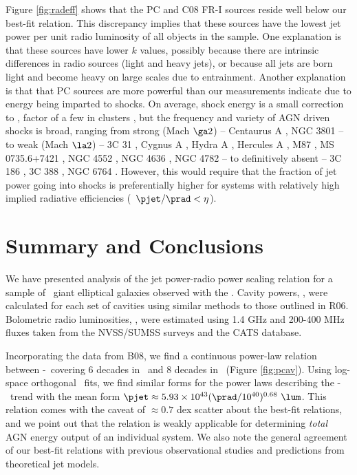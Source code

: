 \documentclass{emulateapj}
\begin{document}
Figure \ref{fig:radeff} shows that the PC and C08 FR-I sources reside
well below our best-fit relation. This discrepancy implies that these
sources have the lowest jet power per unit radio luminosity of all
objects in the sample. One explanation is that these sources have
lower $k$ values, possibly because there are intrinsic differences in
radio sources (light and heavy jets), or because all jets are born
light and become heavy on large scales due to entrainment. Another
explanation is that that PC sources are more powerful than our
measurements indicate due to energy being imparted to shocks. On
average, shock energy is a small correction to \pcav, factor of a few
in clusters \citep{mcnamrev}, but the frequency and variety of AGN
driven shocks is broad, ranging from strong (Mach $\ga 2$) --
Centaurus A \citep{2003ApJ...592..129K, 2009MNRAS.395.1999C}, NGC 3801
\citep{2007ApJ...660..191C} -- to weak (Mach $\la 2$) -- 3C 31
\citep{2002MNRAS.336.1161L}, Cygnus A \citep{2006ApJ...644L...9W},
Hydra A \citep{hydraa}, Hercules A \citep{herca}, M87
\citep{2007ApJ...665.1057F}, MS 0735.6+7421 \citep{ms0735}, NGC 4552
\citep{2006ApJ...648..947M}, NGC 4636 \citep{2009arXiv0909.2942B}, NGC
4782 \citep{2007ApJ...664..804M} -- to definitively absent -- 3C 186
\citep{2008ApJ...684..811S}, 3C 388 \citep{2006ApJ...639..753K}, NGC
6764 \citep{2008ApJ...688..190C}. However, this would require that the
fraction of jet power going into shocks is preferentially higher for
systems with relatively high implied radiative efficiencies
(\ie\ $\pjet/\prad < \eta$).

\section{Summary and Conclusions}
\label{sec:summary}

We have presented analysis of the jet power-radio power scaling
relation for a sample of \samp\ giant elliptical galaxies observed
with the \cxo. Cavity powers, \pjet, were calculated for each set of
cavities using similar methods to those outlined in R06. Bolometric
radio luminosities, \prad, were estimated using 1.4 GHz and 200-400
MHz fluxes taken from the NVSS/SUMSS surveys and the CATS database.

Incorporating the data from B08, we find a continuous power-law
relation between \pjet-\prad\ covering 6 decades in \prad\ and 8
decades in \pjet\ (Figure \ref{fig:pcav}). Using log-space orthogonal
\bces\ fits, we find similar forms for the power laws describing the
\pjet-\prad\ trend with the mean form $\pjet \approx 5.93\times10^{43}
(\prad/10^{40})^{0.68} ~\lum$. This relation comes with the caveat of
$\approx 0.7$ dex scatter about the best-fit relations, and we point
out that the relation is weakly applicable for determining
{\it{total}} AGN energy output of an individual system. We also note
the general agreement of our best-fit relations with previous
observational studies and predictions from theoretical jet models.
\end{document}

